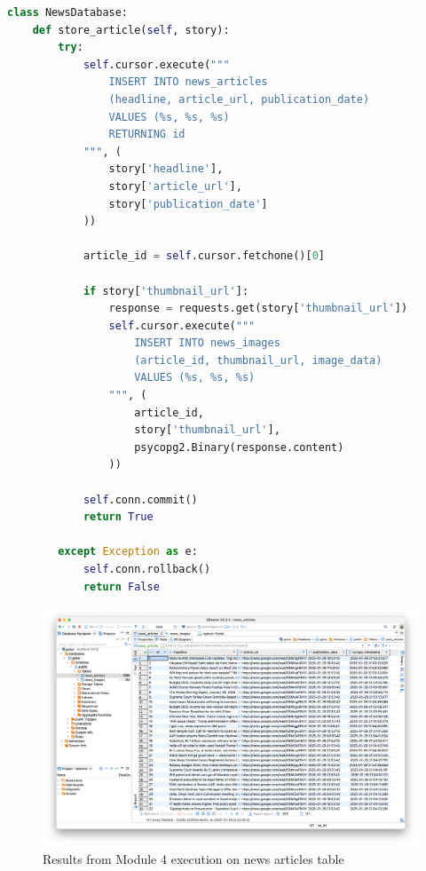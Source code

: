 \documentclass{article}
\begin{document}
\begin{lstlisting}[language=Python]
class NewsDatabase:
    def store_article(self, story):
        try:
            self.cursor.execute("""
                INSERT INTO news_articles 
                (headline, article_url, publication_date)
                VALUES (%s, %s, %s)
                RETURNING id
            """, (
                story['headline'],
                story['article_url'],
                story['publication_date']
            ))
            
            article_id = self.cursor.fetchone()[0]
            
            if story['thumbnail_url']:
                response = requests.get(story['thumbnail_url'])
                self.cursor.execute("""
                    INSERT INTO news_images 
                    (article_id, thumbnail_url, image_data)
                    VALUES (%s, %s, %s)
                """, (
                    article_id,
                    story['thumbnail_url'],
                    psycopg2.Binary(response.content)
                ))
            
            self.conn.commit()
            return True
            
        except Exception as e:
            self.conn.rollback()
            return False
\end{lstlisting}

\begin{figure}[H]
    \centering
    \includegraphics[width=\textwidth]{report/module_4 news_articles.png}
    \caption{Results from Module 4 execution on news articles table}
    \label{fig:module4-results-1}
\end{figure}
\end{document}
